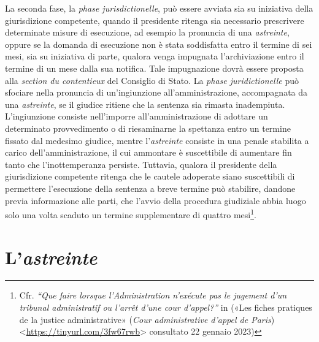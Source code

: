 \documentclass[12pt,it,a4paper,]{report}
\begin{document}
La seconda fase, la \emph{phase jurisdictionelle}, può essere avviata
sia su iniziativa della giurisdizione competente, quando il presidente
ritenga sia necessario prescrivere determinate misure di esecuzione, ad
esempio la pronuncia di una \emph{astreinte}, oppure se la domanda di
esecuzione non è stata soddisfatta entro il termine di sei mesi, sia su
iniziativa di parte, qualora venga impugnata l'archiviazione entro il
termine di un mese dalla sua notifica. Tale impugnazione dovrà essere
proposta alla \emph{section du contentieux} del Consiglio di Stato. La
\emph{phase juridictionelle} può sfociare nella pronuncia di
un'ingiunzione all'amministrazione, accompagnata da una
\emph{astreinte}, se il giudice ritiene che la sentenza sia rimasta
inadempiuta. L'ingiunzione consiste nell'imporre all'amministrazione di
adottare un determinato provvedimento o di riesaminarne la spettanza
entro un termine fissato dal medesimo giudice, mentre l'\emph{astreinte}
consiste in una penale stabilita a carico dell'amministrazione, il cui
ammontare è suscettibile di aumentare fin tanto che l'inottemperanza
persiste. Tuttavia, qualora il presidente della giurisdizione competente
ritenga che le cautele adoperate siano suscettibili di permettere
l'esecuzione della sentenza a breve termine può stabilire, dandone
previa informazione alle parti, che l'avvio della procedura giudiziale
abbia luogo solo una volta scaduto un termine supplementare di quattro
mesi\footnote{Cfr. \emph{``Que faire lorsque l'Administration n'exécute
  pas le jugement d'un tribunal administratif ou l'arrêt d'une cour
  d'appel?''} in ({«Les fiches pratiques de la justice administrative»}
  (\emph{Cour administrative d'appel de Paris})
  \textless{}\url{https://tinyurl.com/3fw67rwb}\textgreater{} consultato
  22 gennaio 2023)}.

\hypertarget{lastreinte}{%
\section{\texorpdfstring{L'\emph{astreinte}}{L'astreinte}}\label{lastreinte}}
\end{document}
